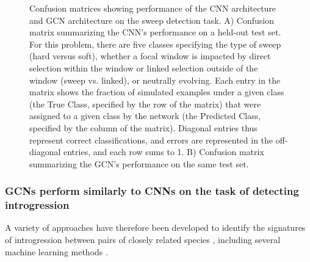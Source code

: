 \begin{figure}
    \centering
    \caption[Confusion matrices showing performance of the CNN architecture and GCN architecture on the sweep detection task]{Confusion matrices showing performance of the CNN architecture and GCN architecture on the sweep detection task. A) Confusion matrix summarizing the CNN’s performance on a held-out test set. For this problem, there are five classes specifying the type of sweep (hard versus soft), whether a focal window is impacted by direct selection within the window or linked selection outside of the window (sweep vs. linked), or neutrally evolving. Each entry in the matrix shows the fraction of simulated examples under a given class (the True Class, specified by the row of the matrix) that were assigned to a given class by the network (the Predicted Class, specified by the column of the matrix). Diagonal entries thus represent correct classifications, and errors are represented in the off-diagonal entries, and each row sums to 1. B) Confusion matrix summarizing the GCN’s performance on the same test set.}
    \label{fig:enter-label}
    
    \label{fig:enter-label}
\end{figure}



\subsubsection{GCNs perform similarly to CNNs on the task of detecting introgression}

A variety of approaches have therefore been developed to identify the signatures of introgression between pairs of closely related species \cite{hudsonEstimationLevelsGene1992,husonReconstructionReticulateNetworks2005,rosenzweigPowerfulMethodsDetecting2016}, including several machine learning methods \cite{gowerDetectingAdaptiveIntrogression2021,rayIntroUNETIdentifyingIntrogressed2023,schriderSupervisedMachineLearning2018a,schriderSupervisedMachineLearning2018a}.

